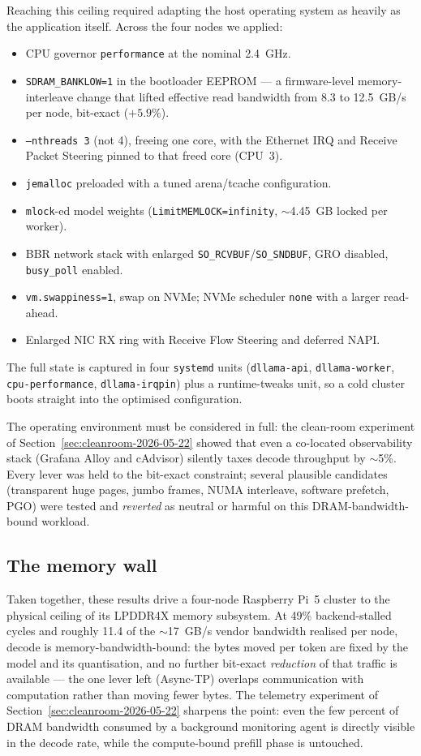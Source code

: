 \documentclass[10pt,a4paper]{article}
\begin{document}
Reaching this ceiling required adapting the host operating system as heavily as the application itself. Across the four nodes we applied:
\begin{itemize}
  \item CPU governor \texttt{performance} at the nominal 2.4~GHz.
  \item \texttt{SDRAM\_BANKLOW=1} in the bootloader EEPROM --- a firmware-level memory-interleave change that lifted effective read bandwidth from 8.3 to 12.5~GB/s per node, bit-exact ($+5.9\%$).
  \item \texttt{--nthreads 3} (not 4), freeing one core, with the Ethernet IRQ and Receive Packet Steering pinned to that freed core (CPU~3).
  \item \texttt{jemalloc} preloaded with a tuned arena/tcache configuration.
  \item \texttt{mlock}-ed model weights (\texttt{LimitMEMLOCK=infinity}, $\sim$4.45~GB locked per worker).
  \item BBR network stack with enlarged \texttt{SO\_RCVBUF}/\texttt{SO\_SNDBUF}, GRO disabled, \texttt{busy\_poll} enabled.
  \item \texttt{vm.swappiness=1}, swap on NVMe; NVMe scheduler \texttt{none} with a larger read-ahead.
  \item Enlarged NIC RX ring with Receive Flow Steering and deferred NAPI.
\end{itemize}
\noindent The full state is captured in four \texttt{systemd} units (\texttt{dllama-api}, \texttt{dllama-worker}, \texttt{cpu-performance}, \texttt{dllama-irqpin}) plus a runtime-tweaks unit, so a cold cluster boots straight into the optimised configuration.

The operating environment must be considered in full: the clean-room experiment of Section~\ref{sec:cleanroom-2026-05-22} showed that even a co-located observability stack (Grafana Alloy and cAdvisor) silently taxes decode throughput by $\sim$5\%. Every lever was held to the bit-exact constraint; several plausible candidates (transparent huge pages, jumbo frames, NUMA interleave, software prefetch, PGO) were tested and \emph{reverted} as neutral or harmful on this DRAM-bandwidth-bound workload.

\subsection{The memory wall}

Taken together, these results drive a four-node Raspberry Pi~5 cluster to the physical ceiling of its LPDDR4X memory subsystem. At 49\% backend-stalled cycles and roughly 11.4 of the $\sim$17~GB/s vendor bandwidth realised per node, decode is memory-bandwidth-bound: the bytes moved per token are fixed by the model and its quantisation, and no further bit-exact \emph{reduction} of that traffic is available --- the one lever left (Async-TP) overlaps communication with computation rather than moving fewer bytes. The telemetry experiment of Section~\ref{sec:cleanroom-2026-05-22} sharpens the point: even the few percent of DRAM bandwidth consumed by a background monitoring agent is directly visible in the decode rate, while the compute-bound prefill phase is untouched.
\end{document}
